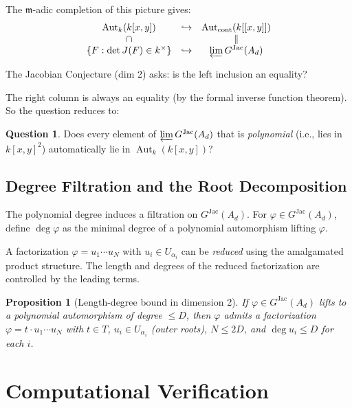 \documentclass[12pt,a4paper]{article}
\newtheorem{proposition}[theorem]{Proposition}
\theoremstyle{definition}
\newtheorem{question}[theorem]{Question}
\newcommand{\kk}{k}
\newcommand{\pp}{\mathfrak{m}}
\newcommand{\Aut}{\operatorname{Aut}}
\newcommand{\GJac}{G^{\mathrm{Jac}}}
\begin{document}
The $\pp$-adic completion of this picture gives:
\[
\begin{array}{ccc}
\Aut_\kk(\kk[x,y]) & \hookrightarrow & \Aut_{\mathrm{cont}}(\kk[[x,y]]) \\
\cap & & \| \\
\{F : \det J(F) \in \kk^\times\} & \hookrightarrow & \varprojlim \GJac(A_d)
\end{array}
\]

The Jacobian Conjecture (dim 2) asks: is the left inclusion an equality?

The right column is always an equality (by the formal inverse function theorem). So the
question reduces to:

\begin{question}
Does every element of $\varprojlim \GJac(A_d)$ that is \emph{polynomial} (i.e., lies in
$\kk[x,y]^2$) automatically lie in $\Aut_\kk(\kk[x,y])$?
\end{question}

\subsection{Degree Filtration and the Root Decomposition}\label{sec:degree-filt}

The polynomial degree induces a filtration on $\GJac(A_d)$. For $\varphi \in \GJac(A_d)$,
define $\deg \varphi$ as the minimal degree of a polynomial automorphism lifting $\varphi$.

A factorization $\varphi = u_1 \cdots u_N$ with $u_i \in U_{\alpha_i}$ can be
\emph{reduced} using the amalgamated product structure. The length and degrees of the
reduced factorization are controlled by the leading terms.

\begin{proposition}[Length-degree bound in dimension 2]
If $\varphi \in \GJac(A_d)$ lifts to a polynomial automorphism of degree $\leq D$, then
$\varphi$ admits a factorization $\varphi = t \cdot u_1 \cdots u_N$ with $t \in T$,
$u_i \in U_{\alpha_i}$ (outer roots), $N \leq 2D$, and $\deg u_i \leq D$ for each $i$.
\end{proposition}

\section{Computational Verification}
\end{document}
